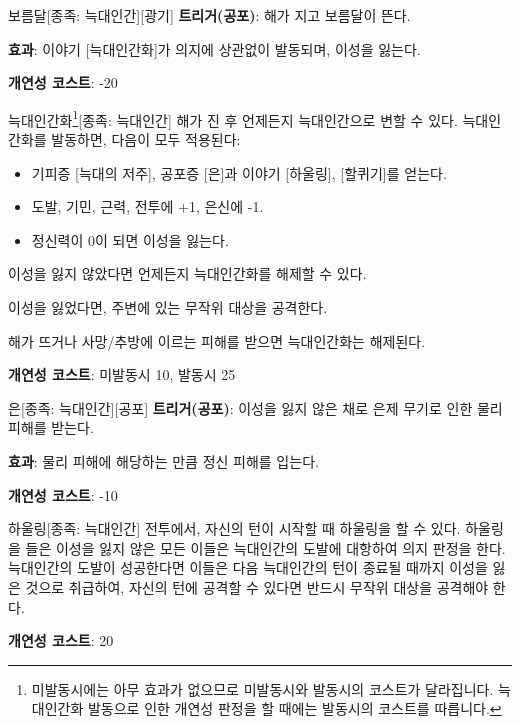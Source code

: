 \documentclass{report}
\begin{document}
	\begin{story}{보름달}{[종족: 늑대인간][광기]}
		\textbf{트리거(공포)}: 해가 지고 보름달이 뜬다.
		
		\textbf{효과}: 이야기 [늑대인간화]가 의지에 상관없이 발동되며, 이성을 잃는다.
		
		\smallskip
		
		\textbf{개연성 코스트}: -20
	\end{story}
	
	\begin{story}{늑대인간화\footnote{미발동시에는 아무 효과가 없으므로 미발동시와 발동시의 코스트가 달라집니다. 늑대인간화 발동으로 인한 개연성 판정을 할 때에는 발동시의 코스트를 따릅니다.}}{[종족: 늑대인간]}
		해가 진 후 언제든지 늑대인간으로 변할 수 있다. 늑대인간화를 발동하면, 다음이 모두 적용된다:
		\begin{itemize}
			\item 기피증 [늑대의 저주], 공포증 [은]과 이야기 [하울링], [할퀴기]를 얻는다.
			\item 도발, 기민, 근력, 전투에 +1, 은신에 -1.
			\item 정신력이 0이 되면 이성을 잃는다.
		\end{itemize}
		
		이성을 잃지 않았다면 언제든지 늑대인간화를 해제할 수 있다.
		
		이성을 잃었다면, 주변에 있는 무작위 대상을 공격한다.
		
		\smallskip
		
		해가 뜨거나 사망/추방에 이르는 피해를 받으면 늑대인간화는 해제된다.
		
		\smallskip
		
		\textbf{개연성 코스트}: 미발동시 10, 발동시 25
	\end{story}
	
	\begin{story}{은}{[종족: 늑대인간][공포]}
		\textbf{트리거(공포)}: 이성을 잃지 않은 채로 은제 무기로 인한 물리 피해를 받는다.
		
		\textbf{효과}: 물리 피해에 해당하는 만큼 정신 피해를 입는다.
		
		\smallskip
		
		\textbf{개연성 코스트}: -10
	\end{story}
	
	\begin{story}{하울링}{[종족: 늑대인간]}
		전투에서, 자신의 턴이 시작할 때 하울링을 할 수 있다. 하울링을 들은 이성을 잃지 않은 모든 이들은 늑대인간의 도발에 대항하여 의지 판정을 한다. 늑대인간의 도발이 성공한다면 이들은 다음 늑대인간의 턴이 종료될 때까지 이성을 잃은 것으로 취급하여, 자신의 턴에 공격할 수 있다면 반드시 무작위 대상을 공격해야 한다.
		
		\smallskip
		
		\textbf{개연성 코스트}: 20
	\end{story}
	
\end{document}
